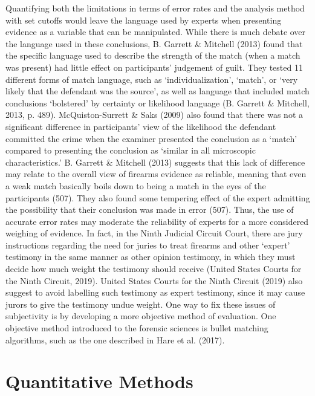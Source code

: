 \documentclass[print]{nuthesis}
\begin{document}
Quantifying both the limitations in terms of error rates and the analysis method with set cutoffs would leave the language used by experts when presenting evidence as a variable that can be manipulated.
While there is much debate over the language used in these conclusions, B. Garrett \& Mitchell (2013) found that the specific language used to describe the strength of the match (when a match was present) had little effect on participants' judgement of guilt. They tested 11 different forms of match language, such as `individualization', `match', or `very likely that the defendant was the source', as well as language that included match conclusions `bolstered' by certainty or likelihood language (B. Garrett \& Mitchell, 2013, p. 489).
McQuiston-Surrett \& Saks (2009) also found that there was not a significant difference in participants' view of the likelihood the defendant committed the crime when the examiner presented the conclusion as a `match' compared to presenting the conclusion as `similar in all microscopic characteristics.'
B. Garrett \& Mitchell (2013) suggests that this lack of difference may relate to the overall view of firearms evidence as reliable, meaning that even a weak match basically boils down to being a match in the eyes of the participants (507).
They also found some tempering effect of the expert admitting the possibility that their conclusion was made in error (507).
Thus, the use of accurate error rates may moderate the reliability of experts for a more considered weighing of evidence.
In fact, in the Ninth Judicial Circuit Court, there are jury instructions regarding the need for juries to treat firearms and other `expert' testimony in the same manner as other opinion testimony, in which they must decide how much weight the testimony should receive (United States Courts for the Ninth Circuit, 2019). United States Courts for the Ninth Circuit (2019) also suggest to avoid labelling such testimony as expert testimony, since it may cause jurors to give the testimony undue weight.
One way to fix these issues of subjectivity is by developing a more objective method of evaluation.
One objective method introduced to the forensic sciences is bullet matching algorithms, such as the one described in Hare et al. (2017).

\hypertarget{quantitative-methods}{%
\section{Quantitative Methods}\label{quantitative-methods}}
\end{document}

